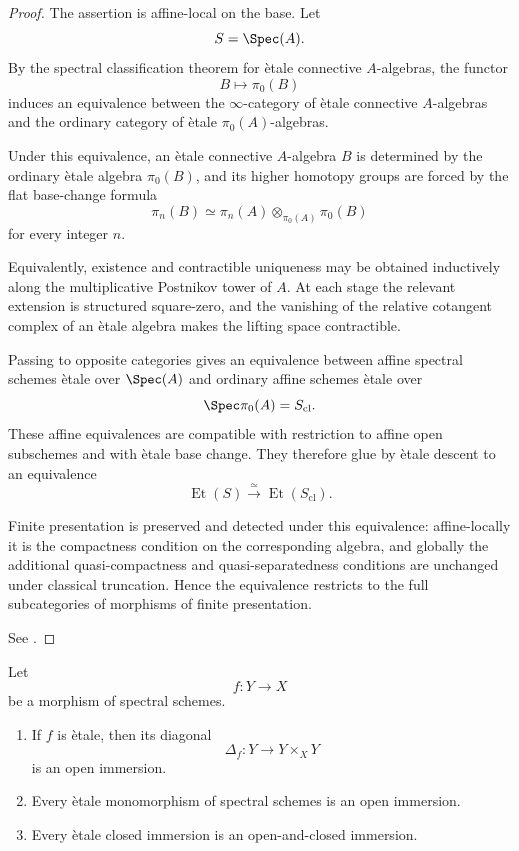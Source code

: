 \begin{proof}
The assertion is affine-local on the base. Let
\[
    S
    =
    \Spec(A).
\]
By the spectral classification theorem for \`etale connective
\(A\)-algebras, the functor
\[
    B
    \longmapsto
    \pi_0(B)
\]
induces an equivalence between the \(\infty\)-category of \`etale
connective \(A\)-algebras and the ordinary category of \`etale
\(\pi_0(A)\)-algebras.

Under this equivalence, an \`etale connective \(A\)-algebra \(B\) is
determined by the ordinary \`etale algebra \(\pi_0(B)\), and its higher
homotopy groups are forced by the flat base-change formula
\[
    \pi_n(B)
    \simeq
    \pi_n(A)
    \otimes_{\pi_0(A)}
    \pi_0(B)
\]
for every integer \(n\).

Equivalently, existence and contractible uniqueness may be obtained
inductively along the multiplicative Postnikov tower of \(A\). At each
stage the relevant extension is structured square-zero, and the
vanishing of the relative cotangent complex of an \`etale algebra makes
the lifting space contractible.

Passing to opposite categories gives an equivalence between affine
spectral schemes \`etale over \(\Spec(A)\) and ordinary affine schemes
\`etale over
\[
    \Spec\pi_0(A)
    =
    S_{\mathrm{cl}}.
\]
These affine equivalences are compatible with restriction to affine open
subschemes and with \`etale base change. They therefore glue by \`etale
descent to an equivalence
\[
    \operatorname{Et}(S)
    \xrightarrow{\simeq}
    \operatorname{Et}(S_{\mathrm{cl}}).
\]

Finite presentation is preserved and detected under this equivalence:
affine-locally it is the compactness condition on the corresponding
algebra, and globally the additional quasi-compactness and
quasi-separatedness conditions are unchanged under classical
truncation. Hence the equivalence restricts to the full subcategories of
morphisms of finite presentation.

See \cite{LurieSAG}.
\end{proof}

\begin{proposition}
\label{prop:etale-diagonal-and-monomorphisms}
Let
\[
    f
    \colon
    Y
    \longrightarrow
    X
\]
be a morphism of spectral schemes.
\begin{enumerate}[label=(\roman*)]
    \item If \(f\) is \`etale, then its diagonal
    \[
        \Delta_f
        \colon
        Y
        \longrightarrow
        Y\times_XY
    \]
    is an open immersion.

    \item Every \`etale monomorphism of spectral schemes is an open
    immersion.

    \item Every \`etale closed immersion is an open-and-closed
    immersion.
\end{enumerate}
\end{proposition}

